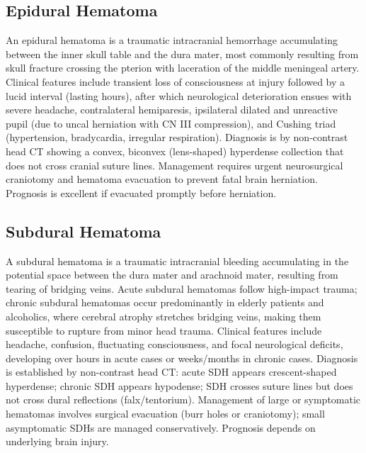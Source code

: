 \subsection{Epidural Hematoma}
\label{sec:Epidural Hematoma}

An epidural hematoma is a traumatic intracranial hemorrhage accumulating between the inner skull table and the dura mater, most commonly resulting from skull fracture crossing the pterion with laceration of the middle meningeal artery. Clinical features include transient loss of consciousness at injury followed by a lucid interval (lasting hours), after which neurological deterioration ensues with severe headache, contralateral hemiparesis, ipsilateral dilated and unreactive pupil (due to uncal herniation with CN III compression), and Cushing triad (hypertension, bradycardia, irregular respiration). Diagnosis is by non-contrast head CT showing a convex, biconvex (lens-shaped) hyperdense collection that does not cross cranial suture lines. Management requires urgent neurosurgical craniotomy and hematoma evacuation to prevent fatal brain herniation. Prognosis is excellent if evacuated promptly before herniation.

\subsection{Subdural Hematoma}
\label{sec:Subdural Hematoma}
A subdural hematoma is a traumatic intracranial bleeding accumulating in the potential space between the dura mater and arachnoid mater, resulting from tearing of bridging veins. Acute subdural hematomas follow high-impact trauma; chronic subdural hematomas occur predominantly in elderly patients and alcoholics, where cerebral atrophy stretches bridging veins, making them susceptible to rupture from minor head trauma. Clinical features include headache, confusion, fluctuating consciousness, and focal neurological deficits, developing over hours in acute cases or weeks/months in chronic cases. Diagnosis is established by non-contrast head CT: acute SDH appears crescent-shaped hyperdense; chronic SDH appears hypodense; SDH crosses suture lines but does not cross dural reflections (falx/tentorium). Management of large or symptomatic hematomas involves surgical evacuation (burr holes or craniotomy); small asymptomatic SDHs are managed conservatively. Prognosis depends on underlying brain injury.

